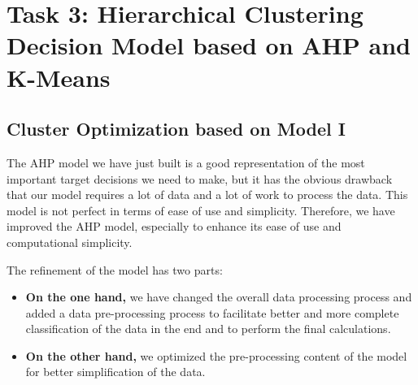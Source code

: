 \section{Task 3: Hierarchical Clustering Decision Model based on AHP and K-Means}%
\subsection{Cluster Optimization based on Model I}
The AHP model we have just built is a good representation of the most important target decisions we need to make, but it has the obvious drawback that our model requires a lot of data and a lot of work to process the data. This model is not perfect in terms of ease of use and simplicity. Therefore, we have improved the AHP model, especially to enhance its ease of use and computational simplicity.

The refinement of the model has two parts:
\begin{itemize}
    \item \textbf{On the one hand,} we have changed the overall data processing process and added a data pre-processing process to facilitate better and more complete classification of the data in the end and to perform the final calculations.
    \item \textbf{On the other hand,} we optimized the pre-processing content of the model for better simplification of the data.
\end{itemize}\\

